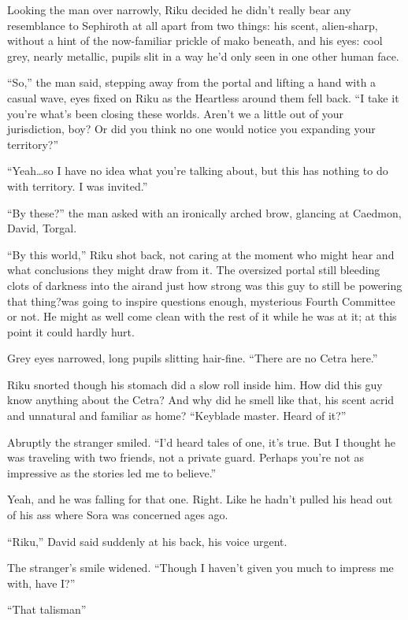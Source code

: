 Looking the man over narrowly, Riku decided he didn't really bear any resemblance to Sephiroth at all apart from two things: his scent, alien-sharp, without a hint of the now-familiar prickle of mako beneath, and his eyes: cool grey, nearly metallic, pupils slit in a way he'd only seen in one other human face.

``So,'' the man said, stepping away from the portal and lifting a hand with a casual wave, eyes fixed on Riku as the Heartless around them fell back. ``I take it you're what's been closing these worlds. Aren't we a little out of your jurisdiction, boy? Or did you think no one would notice you expanding your territory?''

``Yeah\ldots so I have no idea what you're talking about, but this has nothing to do with territory. I was invited.''

``By these?'' the man asked with an ironically arched brow, glancing at Caedmon, David, Torgal.

``By this world,'' Riku shot back, not caring at the moment who might hear and what conclusions they might draw from it. The oversized portal still bleeding clots of darkness into the air\textemdash and just how strong was this guy to still be powering that thing?\textemdash was going to inspire questions enough, mysterious Fourth Committee or not. He might as well come clean with the rest of it while he was at it; at this point it could hardly hurt.

Grey eyes narrowed, long pupils slitting hair-fine. ``There are no Cetra here.''

Riku snorted though his stomach did a slow roll inside him. How did this guy know anything about the Cetra? And why did he smell like that, his scent acrid and unnatural and familiar as home? ``Keyblade master. Heard of it?''

Abruptly the stranger smiled. ``I'd heard tales of one, it's true. But I thought he was traveling with two friends, not a private guard. Perhaps you're not as impressive as the stories led me to believe.''

Yeah, and he was falling for that one. Right. Like he hadn't pulled his head out of his ass where Sora was concerned ages ago.

``Riku,'' David said suddenly at his back, his voice urgent.

The stranger's smile widened. ``Though I haven't given you much to impress me with, have I?''

``That talisman\textemdash ''


